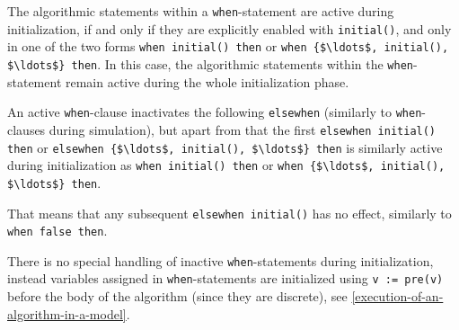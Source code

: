 The algorithmic statements within a \lstinline!when!-statement are active during initialization, if and only if they are explicitly enabled with \lstinline!initial()!, and only in one of the two forms \lstinline!when initial() then! or \lstinline!when {$\ldots$, initial(), $\ldots$} then!.
In this case, the algorithmic statements within the \lstinline!when!-statement remain active during the whole initialization phase.

An active \lstinline!when!-clause inactivates the following \lstinline!elsewhen! (similarly to \lstinline!when!-clauses during simulation), but apart from that the first \lstinline!elsewhen initial() then! or \lstinline!elsewhen {$\ldots$, initial(), $\ldots$} then! is similarly active during initialization as \lstinline!when initial() then! or \lstinline!when {$\ldots$, initial(), $\ldots$} then!.

\begin{nonnormative}
That means that any subsequent \lstinline!elsewhen initial()! has no effect, similarly to \lstinline!when false then!.
\end{nonnormative}

\begin{nonnormative}
There is no special handling of inactive \lstinline!when!-statements during initialization, instead variables assigned in \lstinline!when!-statements are initialized using \lstinline!v := pre(v)! before the body of the algorithm (since they are discrete), see \cref{execution-of-an-algorithm-in-a-model}.
\end{nonnormative}

